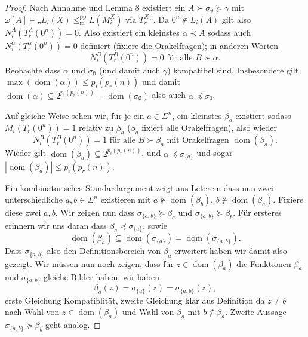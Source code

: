 \documentclass[nofonts]{uebung}
\theoremstyle{definition}
\DeclareMathOperator{\dom}{dom}
\def\leqmpp{\ensuremath{\leq_\mathrm{m}^\mathrm{pp}}}
\begin{document}
\begin{proof}
    Nach Annahme und Lemma 8 existiert ein $A\succ\sigma_\emptyset\succeq \gamma$ mit $\omega[A] \vDash „L_{i}(X)\leqmpp L(M_i^X)\text{ via }T^X_r“$.
    Da $0^n\not\in L_i(A)$ gilt also $N^A_i(T_r^A(0^n))=0$.
    Also existiert ein kleinstes $\alpha\prec A$ sodass auch $N^\alpha_i(T_r^\alpha(0^n))=0$ definiert (fixiere die Orakelfragen); in anderen Worten
    \begin{equation}
        N^B_i(T_r^B(0^n))=0 \text{ für alle }B\succ\alpha.
    \end{equation}
    Beobachte dass $\alpha$ und $\sigma_\emptyset$ (und damit auch $\gamma$) kompatibel sind.
    Insbesondere gilt $\max(\dom(\alpha))\leq p_i(p_r(n))$ und damit $\dom(\alpha)\subseteq 2^{p_i(p_r(n))}=\dom(\sigma_\emptyset)$ also auch $\alpha\preceq \sigma_\emptyset$.

    Auf gleiche Weise sehen wir, für je ein $a\in\Sigma^n$, ein kleinstes $\beta_a$ existiert sodass $M_i(T_r(0^n))=1$ relativ zu $\beta_a$ ($\beta_a$ fixiert alle Orakelfragen), also wieder
    \begin{equation}
        N^B_i(T_r^B(0^n))=1 \text{ für alle $B\succ\beta_a$ mit Orakelfragen $\dom(\beta_a)$}.
    \end{equation}
    Wieder gilt $\dom(\beta_a)\subseteq 2^{p_i(p_r(n))}$, und $\alpha\preceq \sigma_{\{a\}}$ und sogar $|\dom(\beta_a)|\leq p_i(p_r(n))$.

    Ein kombinatorisches Standardargument zeigt aus Leterem dass nun zwei unterschiedliche $a,b\in \Sigma^n$ existieren mit $a\not\in \dom(\beta_b)$, $b\not\in \dom(\beta_a)$. Fixiere diese zwei $a,b$.
    Wir zeigen nun dass $\sigma_{\{a,b\}} \succeq \beta_a$ und $\sigma_{\{a,b\}} \succeq \beta_b$.
    Für ersteres erinnern wir uns daran dass $\beta_a\preceq\sigma_{\{a\}}$, sowie
    \[ \dom(\beta_a)\subseteq \dom(\sigma_{\{a\}})=\dom(\sigma_{\{a,b\}}). \]
    Dass $\sigma_{\{a,b\}}$ also den Definitionsbereich von $\beta_a$ erweitert haben wir damit also gezeigt. Wir müssen nun noch zeigen, dass für $z\in\dom(\beta_a)$ die Funktionen $\beta_a$ und $\sigma_{\{a,b\}}$ gleiche Bilder haben: wir haben
    \[ \beta_a(z)=\sigma_{\{a\}}(z)=\sigma_{\{a,b\}}(z), \]
    erste Gleichung Kompatiblität, zweite Gleichung klar aus Definition da $z\neq b$ nach Wahl von $z\in\dom(\beta_a)$ und Wahl von $\beta_a$ mit $b\not\in \beta_a$.
    Zweite Aussage $\sigma_{\{a,b\}} \succeq \beta_b$ geht analog.


\end{proof}
\end{document}
